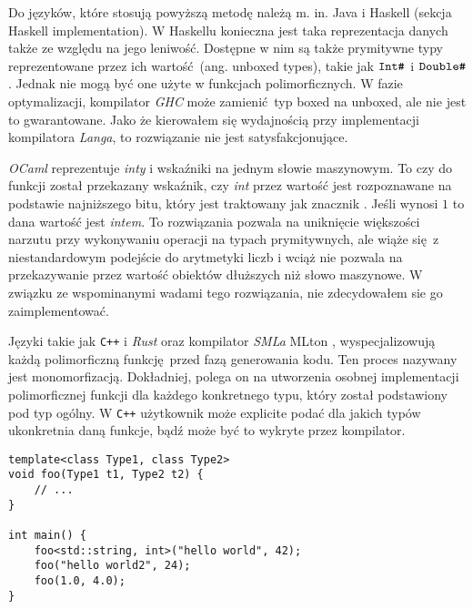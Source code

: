 \documentclass[declaration,shortabstract]{iithesis}
\begin{document}
Do języków, które stosują powyższą metodę należą m. in. Java 
\cite{type_erasure} i Haskell 
\cite{haskell_poly}(sekcja Haskell implementation).
W Haskellu konieczna jest taka reprezentacja danych także ze względu na jego 
leniwość. Dostępne w nim są także prymitywne typy reprezentowane przez 
ich wartość (ang. unboxed types), takie jak $\verb!Int#!$ i 
$\verb!Double#!$. Jednak nie mogą być one użyte w funkcjach polimorficznych. 
W fazie optymalizacji, kompilator \textit{GHC} może zamienić typ boxed 
na unboxed, ale nie jest to gwarantowane. Jako że kierowałem się wydajnością
przy implementacji kompilatora \textit{Langa}, to rozwiązanie nie jest 
satysfakcjonujące.

\textit{OCaml} reprezentuje \textit{inty} i wskaźniki na jednym słowie 
maszynowym. To czy do funkcji został przekazany wskaźnik, czy \textit{int}
przez wartość jest rozpoznawane na podstawie najniższego bitu, który jest 
traktowany jak znacznik \cite{ocaml_31bit}. Jeśli wynosi $1$ to dana wartość jest \textit{intem}.
To rozwiązania pozwala na uniknięcie większości narzutu przy wykonywaniu 
operacji na typach prymitywnych, ale wiąże się z niestandardowym podejście do 
arytmetyki liczb i wciąż nie pozwala na przekazywanie przez wartość obiektów 
dłuższych niż słowo maszynowe. W związku ze wspominanymi wadami tego 
rozwiązania, nie zdecydowałem sie go zaimplementować.

Języki takie jak \texttt{C++} i \textit{Rust} oraz kompilator \textit{SMLa} 
MLton \cite{mono_mlton}, wyspecjalizowują każdą polimorficzną funkcję przed 
fazą generowania 
kodu. Ten proces nazywany jest monomorfizacją. Dokładniej, polega on na 
utworzenia osobnej 
implementacji polimorficznej funkcji dla każdego konkretnego typu, który 
został 
podstawiony pod typ ogólny. W \texttt{C++} użytkownik może explicite podać 
dla jakich typów ukonkretnia daną funkcje, bądź może być to wykryte przez 
kompilator.

\begin{lstlisting}[frame=single, caption={Polimorficzna funkcja w 
\texttt{C++} z użyciem szablonów (ang. template)}]
template<class Type1, class Type2>
void foo(Type1 t1, Type2 t2) {
    // ...
}

int main() {
    foo<std::string, int>("hello world", 42);
    foo("hello world2", 24);
    foo(1.0, 4.0);
}
\end{lstlisting}
\end{document}
